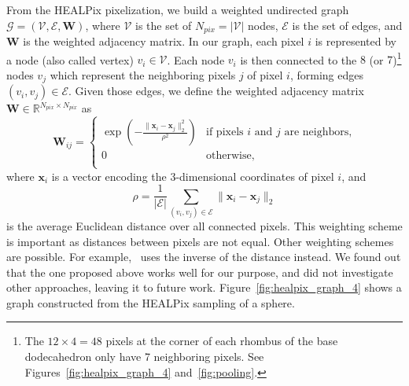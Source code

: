\documentclass[final,twocolumn,3p,times,authoryear]{elsarticle}
\newcommand{\figref}[1]{Figure~\ref{fig:#1}}
\renewcommand{\b}[1]{{\bm{#1}}}   %
\newcommand{\1}{\b{1}}              %
\newcommand{\0}{\b{0}}              %
\newcommand{\G}{\mathcal{G}}
\newcommand{\V}{\mathcal{V}}
\newcommand{\E}{\mathcal{E}}
\newcommand{\W}{\b{W}}
\newcommand{\x}{\b{x}}
\newcommand{\R}{\mathbb{R}}
\begin{document}
From the HEALPix pixelization, we build a weighted undirected graph $\G = (\V, \E, \W)$, where $\V$ is the set of $N_{pix} = |\V|$ nodes, $\E$ is the set of edges, and $\W$ is the weighted adjacency matrix.
In our graph, each pixel $i$ is represented by a node (also called vertex) $v_i \in \V$.
Each node $v_i$ is then connected to the $8$ (or $7$)\footnote{\label{neighbors}The $12 \times 4 = 48$ pixels at the corner of each rhombus of the base dodecahedron only have 7 neighboring pixels. See Figures~\ref{fig:healpix_graph_4} and~\ref{fig:pooling}.} nodes $v_j$ which represent the neighboring pixels $j$ of pixel $i$, forming edges $(v_i, v_j) \in \E$. Given those edges, we define the weighted adjacency matrix $\W \in \R^{N_{pix} \times N_{pix}}$ as
\begin{equation*}
	\W_{ij} = \begin{cases}
		\exp \left( -\frac{\|\x_i-\x_j\|_2^2}{\rho^2} \right) & \text{if pixels $i$ and $j$ are neighbors,} \\
		0 & \text{otherwise,} \\
	\end{cases}
\end{equation*}
where $\x_i$ is a vector encoding the 3-dimensional coordinates of pixel $i$, and
\begin{equation*}
	\rho = \frac{1}{|\E|} \sum_{(v_i, v_j) \in \E} \|\x_i-\x_j\|_2
\end{equation*}
is the average Euclidean distance over all connected pixels. This weighting scheme is important as distances between pixels are not equal.
Other weighting schemes are possible. For example,~\cite{khasanova2017graphomni} uses the inverse of the distance instead. We found out that the one proposed above works well for our purpose, and did not investigate other approaches, leaving it to future work.
\figref{healpix_graph_4} shows a graph constructed from the HEALPix sampling of a sphere.

\end{document}
